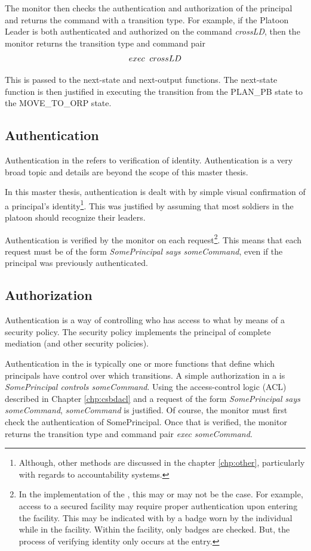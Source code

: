 \documentclass[../../main/main.tex]{subfiles}
\begin{document}
The monitor then checks the authentication and authorization of the principal and returns the command with a transition type.  For example, if the Platoon Leader is both authenticated and authorized on the command \textit{crossLD}, then the monitor returns the transition type and command pair 
\[exec \hspace{0.2cm} crossLD\]

This is passed to the next-state and next-output functions.  The next-state function is then justified in executing the transition from the PLAN_PB state to the MOVE_TO_ORP state.  

\subsection{Authentication}
Authentication in the  refers to verification of identity.  Authentication is a very broad topic and details are beyond the scope of this master thesis.  

In this master thesis, authentication is dealt with by simple visual confirmation of a principal's identity\footnote{Although, other methods are discussed in the chapter \ref{chp:other}, particularly with regards to accountability systems.}.  This was justified by assuming that most soldiers in the platoon should recognize their leaders.

Authentication is verified by the monitor on each request\footnote{In the implementation of the , this may or may not be the case.  For example, access to a secured facility may require proper authentication upon entering the facility.  This may be indicated with by a badge worn by the individual while in the facility.  Within the facility, only badges are checked.  But, the process of verifying identity only occurs at the entry.}.  This means that each request must be of the form \textit{SomePrincipal says someCommand}, even if the principal was previously authenticated.  

\subsection{Authorization}
Authentication is a way of controlling who has access to what by means of a security policy.  The security policy implements the principal of complete mediation (and other security policies).  

Authentication in the  is typically one or more functions that define which principals have control over which transitions.  A simple authorization in a  is \textit{SomePrincipal controls someCommand}.    Using the access-control logic (ACL) described in Chapter \ref{chp:csbdacl} and a request of the form \textit{SomePrincipal says someCommand}, \textit{someCommand} is justified.  Of course, the monitor must first check the authentication of SomePrincipal.  Once that is verified, the monitor returns the transition type and command pair \textit{exec someCommand}.
\end{document}

